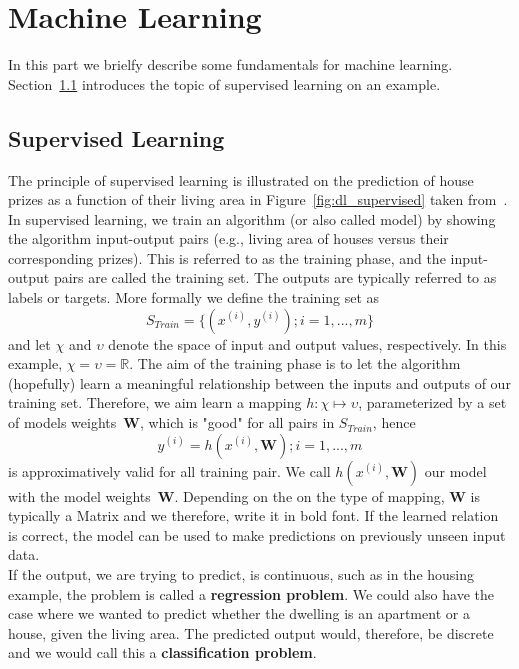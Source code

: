 \section{Machine Learning}
In this part we brielfy describe some fundamentals for machine learning. Section~\ref{sec:ml_supervised} introduces the topic of supervised learning on an example.

\subsection{Supervised Learning} \label{sec:ml_supervised}
The principle of supervised learning is illustrated on the prediction of house prizes as a function of their living area in Figure~\ref{fig:dl_supervised} taken from~\cite{Ng2012StanfordNotes}. In supervised learning, we train an algorithm (or also called model) by showing the algorithm input-output pairs (e.g., living area of houses versus their corresponding prizes). This is referred to as the training phase, and the input-output pairs are called the training set. The outputs are typically referred to as labels or targets. More formally we define the training set as
\begin{equation}
   S_{Train} = \{(x^{(i)}, y^{(i)}); i = 1,...,m\}
   \label{eq:training_set}
\end{equation}
and let $\chi$ and $\upsilon$ denote the space of input and output values, respectively. In this example, $\chi = \upsilon = \mathbb{R}$. The aim of the training phase is to let the algorithm (hopefully) learn a meaningful relationship between the inputs and outputs of our training set. Therefore, we aim learn a mapping $h : \chi \mapsto \upsilon$, parameterized by a set of models weights~$\textbf{W}$, which is "good" for all pairs in $S_{Train}$, hence
\begin{equation}
   y^{(i)} = h(x^{(i)}, \mathbf{W}); i = 1,...,m
   \label{eq:model}
\end{equation}
is approximatively valid for all training pair. We call $h(x^{(i)}, \mathbf{W})$ our model with the model weights~$\textbf{W}$. Depending on the on the type of mapping, $\mathbf{W}$ is typically a Matrix and we therefore, write it in bold font. If the learned relation is correct, the model can be used to make predictions on previously unseen input data.\\
If the output, we are trying to predict, is continuous, such as in the housing example, the problem is called a \textbf{regression problem}. We could also have the case where we wanted to predict whether the dwelling is an apartment or a house, given the living area. The predicted output would, therefore, be discrete and we would call this a \textbf{classification problem}.\\
